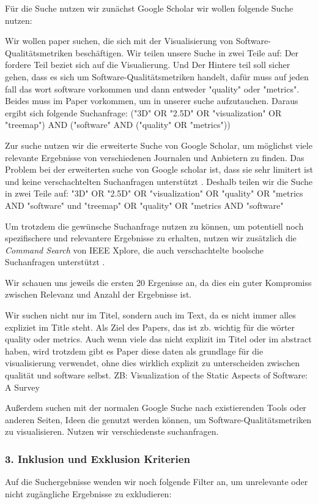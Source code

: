 Für die Suche nutzen wir zunächst Google Scholar wir wollen folgende Suche nutzen:

Wir wollen paper suchen, die sich mit der Visualisierung von Software-Qualitätsmetriken beschäftigen.
Wir teilen unsere Suche in zwei Teile auf:
Der fordere Teil beziet sich auf die Visualierung.
Und 
Der Hintere teil soll sicher gehen, dass es sich um Software-Qualitätsmetriken handelt, dafür muss auf jeden fall das wort software vorkommen und dann entweder "quality" oder "metrics". 
Beides muss im Paper vorkommen, um in unserer suche aufzutauchen.
Daraus ergibt sich folgende Suchanfrage:
("3D" OR "2.5D" OR "visualization" OR "treemap") AND ("software" AND ("quality" OR "metrics"))

Zur suche nutzen wir die erweiterte Suche von Google Scholar, um möglichst viele relevante Ergebnisse von verschiedenen Journalen und Anbietern zu finden.
Das Problem bei der erweiterten suche von Google scholar ist, dass sie sehr limitert ist und keine verschachtelten Suchanfragen unterstützt \cite{scholar_queries_2023}.
Deshalb teilen wir die Suche in zwei Teile auf: 
"3D" OR "2.5D" OR "visualization" OR "quality" OR "metrics AND "software"
und 
"treemap" OR "quality" OR "metrics AND "software"

Um trotzdem die gewünsche Suchanfrage nutzen zu können, um potentiell noch spezifischere und relevantere Ergebnisse zu erhalten, nutzen wir zusätzlich die \textit{Command Search} von IEEE Xplore, die auch verschachtelte boolsche Suchanfragen unterstützt \cite{ieee_xplore_boolean_2025}.

Wir schauen uns jeweils die ersten 20 Ergenisse an, da dies ein guter Kompromiss zwischen Relevanz und Anzahl der Ergebnisse ist.

Wir suchen nicht nur im Titel, sondern auch im Text, da es nicht immer alles expliziet im Title steht. 
Als Ziel des Papers, das ist zb. wichtig für die wörter quality oder metrics. Auch wenn viele das nicht explizit im Titel oder im abstract haben, wird trotzdem gibt es Paper diese daten als grundlage für die visualisierung verwendet, ohne dies wirklich explizit zu unterscheiden zwischen qualität und software selbst. ZB: Visualization of the Static Aspects of Software: A Survey

Außerdem suchen mit der normalen Google Suche nach existierenden Tools oder anderen Seiten, Ideen die genutzt werden können, um Software-Qualitätsmetriken zu visualisieren. Nutzen wir verschiedenste suchanfragen.

\subsubsection*{3. Inklusion und Exklusion Kriterien} \label{sec:InklusionExklusionKriterien}
Auf die Suchergebnisse wenden wir noch folgende Filter an, um unrelevante oder nicht zugängliche Ergebnisse zu exkludieren:

